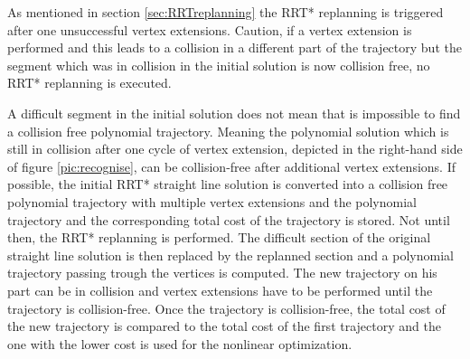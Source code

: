 As mentioned in section \ref{sec:RRTreplanning} the RRT* replanning is triggered after one unsuccessful vertex extensions. Caution, if a vertex extension is performed and this leads to a collision in a different part of the trajectory but the segment which was in collision in the initial solution is now collision free, no RRT* replanning is executed. \newline

A difficult segment in the initial solution does not mean that is impossible to find a collision free polynomial trajectory. Meaning the polynomial solution which is still in collision after one cycle of vertex extension, depicted in the right-hand side of figure \ref{pic:recognise}, can be collision-free after additional vertex extensions. If possible, the initial RRT* straight line solution is converted into a collision free polynomial trajectory with multiple vertex extensions and the polynomial trajectory and the corresponding total cost of the trajectory is stored. \newline
Not until then, the RRT* replanning is performed. The difficult section of the original straight line solution is then replaced by the replanned section and a polynomial trajectory passing trough the vertices is computed. The new trajectory on his part can be in collision and vertex extensions have to be performed until the trajectory is collision-free. Once the trajectory is collision-free, the total cost of the new trajectory is compared to the total cost of the first trajectory and the one with the lower cost is used for the nonlinear optimization.



%
%
%
%
%
%
%
%
%

